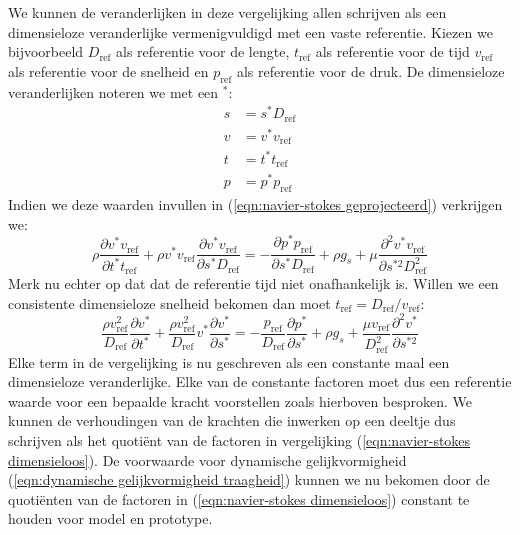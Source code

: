 We kunnen de veranderlijken in deze vergelijking allen schrijven als een dimensieloze veranderlijke vermenigvuldigd met een vaste referentie. Kiezen we bijvoorbeeld $D_{\text{ref}}$ als referentie voor de lengte, $t_{\text{ref}}$ als referentie voor de tijd  $v_{\text{ref}}$ als referentie voor de snelheid en $p_{\text{ref}}$ als referentie voor de druk. De dimensieloze veranderlijken noteren we met een $^*$: 
\begin{align}
	s &= s^* D_{\text{ref}} \nonumber \\
	v &= v^* v_{\text{ref}}  \\
	t &= t^* t_{\text{ref}} \nonumber \\
	p &= p^* p_{\text{ref}} \nonumber
	\label{eqn:referentie grootheden}
\end{align}
Indien we deze waarden invullen in (\ref{eqn:navier-stokes geprojecteerd}) verkrijgen we:
\begin{equation}
	\rho \frac{\partial v^* v_{\text{ref}}}{\partial t^* t_{\text{ref}}} + \rho v^* v_{\text{ref}} \frac{\partial v^* v_{\text{ref}}}{\partial s^* D_{\text{ref}}} = -\frac{\partial p^* p_{\text{ref}}}{\partial s^*D_{\text{ref}}} + \rho g_s + \mu \frac{\partial^2 v^* v_{\text{ref}}}{\partial s^{*2} D_{\text{ref}}^2}
\end{equation}
Merk nu echter op dat dat de referentie tijd niet onafhankelijk is. Willen we een consistente dimensieloze snelheid bekomen dan moet $t_{\text{ref}} = D_{\text{ref}}/v_{\text{ref}}$:
\begin{equation}
	\frac{\rho v_{\text{ref}}^2}{D_{\text{ref}}} \frac{\partial v^*}{\partial t^*} + \frac{\rho v_{\text{ref}}^2}{D_{\text{ref}}}v^* \frac{\partial v^*}{\partial s^*} = -\frac{p_{\text{ref}}}{D_{\text{ref}}} \frac{\partial p^*}{\partial s^*} + \rho g_s + \frac{\mu v_{\text{ref}}}{D_{\text{ref}}^2} \frac{\partial^2 v^*}{\partial s^{*2}}
	\label{eqn:navier-stokes dimensieloos}
\end{equation}
Elke term in de vergelijking is nu geschreven als een constante maal een dimensieloze veranderlijke. Elke van de constante factoren moet dus een referentie waarde voor een bepaalde kracht voorstellen zoals hierboven besproken. We kunnen de verhoudingen van de krachten die inwerken op een deeltje dus schrijven als het quotiënt van de factoren in vergelijking (\ref{eqn:navier-stokes dimensieloos}). De voorwaarde voor dynamische gelijkvormigheid (\ref{eqn:dynamische gelijkvormigheid traagheid}) kunnen we nu bekomen door de quotiënten van de factoren in (\ref{eqn:navier-stokes dimensieloos}) constant te houden voor model en prototype.

